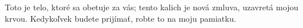 Toto je telo, ktoré sa obetuje za vás; 
tento kalich je nová zmluva, uzavretá mojou 
krvou. Kedykoľvek budete prijímať, robte to na moju pamiatku. 
